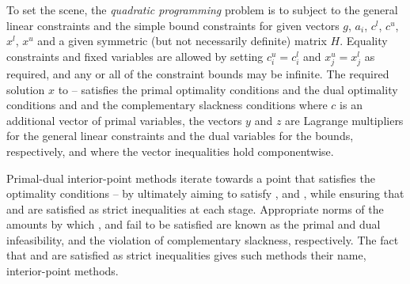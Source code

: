 \documentclass[twoside]{article}
\begin{document}
To set the scene, the {\em quadratic programming} problem is to
subject to the general linear constraints
and the simple bound constraints
for given
vectors $g$, $a_{i}$, $c^{l}$, $c^{u}$, $x^{l}$, $x^{u}$
and a given symmetric (but not necessarily definite) matrix $H$. Equality
constraints and fixed variables are allowed by setting
$c_{i}^{u} = c_{i}^{l}$ and $x_{j}^{u} = x_{j}^{l}$ as required,
and any or all of the constraint bounds may be infinite.
The required solution $x$ to -- satisfies
the primal optimality conditions
and
the dual optimality conditions
and
and the complementary slackness conditions
where $c$ is an additional vector of primal variables,
the vectors $y$ and $z$ are Lagrange multipliers for
the general linear constraints and the dual variables for the bounds,
respectively, and where the vector inequalities hold componentwise.

Primal-dual interior-point methods iterate towards a point
that satisfies the optimality conditions --
by ultimately aiming to satisfy
,  and , while ensuring that
 and  are
satisfied as strict inequalities at each stage.
Appropriate norms of the amounts by
which ,  and  fail to be satisfied are known as the
primal and dual infeasibility, and the violation of complementary slackness,
respectively. The fact that  and  are satisfied as strict
inequalities gives such methods their name, interior-point methods.
\end{document}
